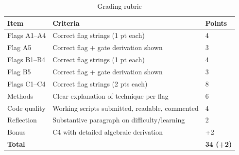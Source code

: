 \documentclass[a4paper, 12pt]{article}
\begin{document}
\begin{table}[H]
\centering
\begin{tabularx}{\textwidth}{lXl}
\toprule
\textbf{Item} & \textbf{Criteria} & \textbf{Points} \\
\midrule
Flags A1--A4   & Correct flag strings (1 pt each)                  & 4 \\
Flag A5        & Correct flag + gate derivation shown               & 3 \\
Flags B1--B4   & Correct flag strings (1 pt each)                   & 4 \\
Flag B5        & Correct flag + gate derivation shown               & 3 \\
Flags C1--C4   & Correct flag strings (2 pts each)                  & 8 \\
Methods        & Clear explanation of technique per flag            & 6 \\
Code quality   & Working scripts submitted, readable, commented     & 4 \\
Reflection     & Substantive paragraph on difficulty/learning       & 2 \\
Bonus          & C4 with detailed algebraic derivation              & +2 \\
\midrule
\textbf{Total} &                                                    & \textbf{34 (+2)} \\
\bottomrule
\end{tabularx}
\caption{Grading rubric}
\end{table}
\end{document}
